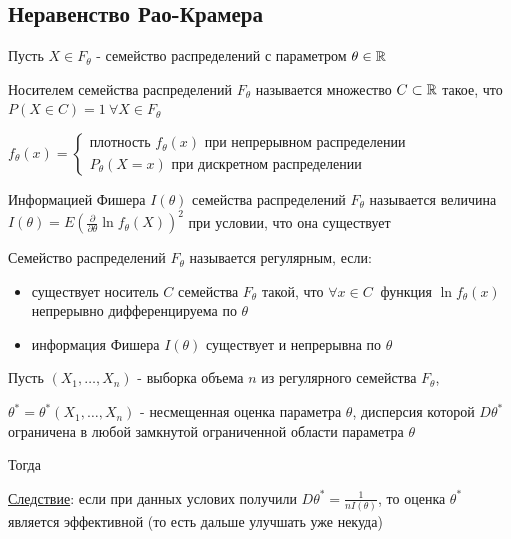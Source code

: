 \documentclass[12pt]{article}
\begin{document}
\subsection{Неравенство Рао-Крамера}

Пусть $X \in F_\theta$ - семейство распределений с параметром $\theta \in \mathbb{R}$

\Def Носителем семейства распределений $F_\theta$ называется множество $C \subset \mathbb{R}$
такое, что $P(X \in C) = 1 \ \forall X \in F_\theta$

$f_\theta(x) = \begin{cases}
    \text{плотность } f_\theta(x) \text{ при непрерывном распределении} \\
    P_\theta(X = x) \text{ при дискретном распределении}
\end{cases}$

\hypertarget{fishers_information}{}

\Def Информацией Фишера $I(\theta)$ семейства распределений $F_\theta$ называется величина 
$I(\theta) = E\left(\frac{\partial}{\partial \theta} \ln f_\theta(X)\right)^2$ при условии, что
она существует

\Def Семейство распределений $F_\theta$ называется регулярным, если:

\begin{itemize}
    \item существует носитель $C$ семейства $F_\theta$ такой, что $\forall x \in C \ $ функция $\ln f_\theta(x)$ непрерывно дифференцируема по $\theta$
    \item информация Фишера $I(\theta)$ существует и непрерывна по $\theta$
\end{itemize}

\hypertarget{rao_kramer_inequality}{}

\begin{MyTheorem}
    \Ths Пусть $(X_1, \dots, X_n)$ - выборка объема $n$ из регулярного семейства $F_\theta$,

    $\theta^* = \theta^*(X_1, \dots, X_n)$ - несмещенная оценка параметра $\theta$, дисперсия которой
    $D\theta^*$ ограничена в любой замкнутой ограниченной области параметра $\theta$

    Тогда 
\end{MyTheorem}

\underline{Следствие}: если при данных услових получили $D\theta^* = \frac{1}{n I(\theta)}$, то оценка $\theta^*$ является эффективной 
(то есть дальше улучшать уже некуда)
\end{document}
